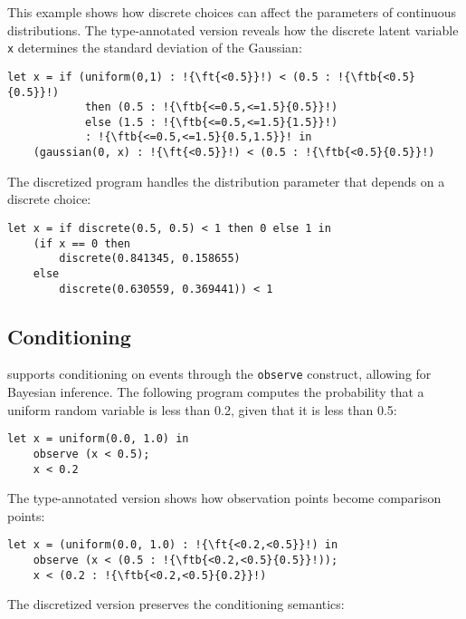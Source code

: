 \documentclass[acmsmall,screen,dvipsnames,x11names,nonacm,anonymous,review]{acmart}
\newcommand{\codetype}[1]{\textcolor{typecolor}{\ttfamily\small#1}}
\newcommand{\ftb}[2]{\codetype{float[\{#1\}; \{#2\}]}}  %
\newcommand{\ft}[1]{\codetype{float[\{#1\}; T]}}        %
\begin{document}
\noindent This example shows how discrete choices can affect the parameters of continuous distributions. The type-annotated version reveals how the discrete latent variable \texttt{x} determines the standard deviation of the Gaussian:

\begin{lstlisting}[aboveskip=1em,belowskip=1em,escapechar=!]
    let x = if (uniform(0,1) : !{\ft{<0.5}}!) < (0.5 : !{\ftb{<0.5}{0.5}}!)
            then (0.5 : !{\ftb{<=0.5,<=1.5}{0.5}}!)
            else (1.5 : !{\ftb{<=0.5,<=1.5}{1.5}}!)
            : !{\ftb{<=0.5,<=1.5}{0.5,1.5}}! in
    (gaussian(0, x) : !{\ft{<0.5}}!) < (0.5 : !{\ftb{<0.5}{0.5}}!)
\end{lstlisting}

\noindent The discretized program handles the distribution parameter that depends on a discrete choice:

\begin{lstlisting}[aboveskip=1em,belowskip=1em]
    let x = if discrete(0.5, 0.5) < 1 then 0 else 1 in
    (if x == 0 then
        discrete(0.841345, 0.158655)
    else
        discrete(0.630559, 0.369441)) < 1
\end{lstlisting}

\subsection{Conditioning}

\Slice{} supports conditioning on events through the \texttt{observe} construct, allowing for Bayesian inference. The following program computes the probability that a uniform random variable is less than 0.2, given that it is less than 0.5:

\begin{lstlisting}[aboveskip=1em,belowskip=1em,escapechar=!]
    let x = uniform(0.0, 1.0) in
    observe (x < 0.5);
    x < 0.2
\end{lstlisting}

\noindent The type-annotated version shows how observation points become comparison points:

\begin{lstlisting}[aboveskip=1em,belowskip=1em,escapechar=!]
    let x = (uniform(0.0, 1.0) : !{\ft{<0.2,<0.5}}!) in
    observe (x < (0.5 : !{\ftb{<0.2,<0.5}{0.5}}!));
    x < (0.2 : !{\ftb{<0.2,<0.5}{0.2}}!)
\end{lstlisting}

\noindent The discretized version preserves the conditioning semantics:
\end{document}
